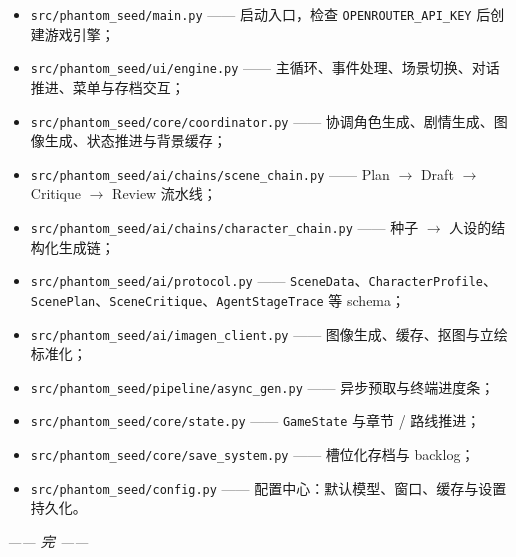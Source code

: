 \documentclass[12pt,a4paper]{article}
\newcommand{\brk}{\discretionary{}{}{}}
\begin{document}
\begin{itemize}
    \item \texttt{src/\brk phantom\_seed/\brk main.py} —— 启动入口，检查 \texttt{OPENROUTER\_\brk API\_KEY} 后创建游戏引擎；
    \item \texttt{src/\brk phantom\_seed/\brk ui/\brk engine.py} —— 主循环、事件处理、场景切换、对话推进、菜单与存档交互；
    \item \texttt{src/\brk phantom\_seed/\brk core/\brk coordinator.py} —— 协调角色生成、剧情生成、图像生成、状态推进与背景缓存；
    \item \texttt{src/\brk phantom\_seed/\brk ai/\brk chains/\brk scene\_chain.py} —— Plan $\to$ Draft $\to$ Critique $\to$ Review 流水线；
    \item \texttt{src/\brk phantom\_seed/\brk ai/\brk chains/\brk character\_chain.py} —— 种子 $\to$ 人设的结构化生成链；
    \item \texttt{src/\brk phantom\_seed/\brk ai/\brk protocol.py} —— \texttt{SceneData}、\texttt{CharacterProfile}、\texttt{ScenePlan}、\texttt{SceneCritique}、\texttt{AgentStageTrace} 等 schema；
    \item \texttt{src/\brk phantom\_seed/\brk ai/\brk imagen\_client.py} —— 图像生成、缓存、抠图与立绘标准化；
    \item \texttt{src/\brk phantom\_seed/\brk pipeline/\brk async\_gen.py} —— 异步预取与终端进度条；
    \item \texttt{src/\brk phantom\_seed/\brk core/\brk state.py} —— \texttt{GameState} 与章节 / 路线推进；
    \item \texttt{src/\brk phantom\_seed/\brk core/\brk save\_system.py} —— 槽位化存档与 backlog；
    \item \texttt{src/\brk phantom\_seed/\brk config.py} —— 配置中心：默认模型、窗口、缓存与设置持久化。
\end{itemize}

\vspace{1.5em}
\begin{center}
\itshape —— 完 ——
\end{center}
\end{document}
